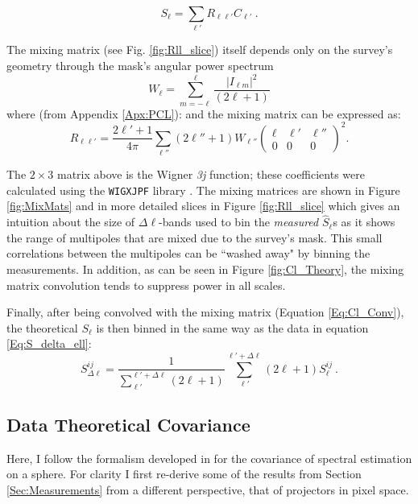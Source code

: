 \begin{equation}
S_{\ell} = \sum_{\ell'}R_{\ell \ell'} C_{\ell'} \ .
\label{Eq:Cl_Conv}
\end{equation}

\qquad The mixing matrix (see Fig. \ref{fig:Rll_slice}) itself depends only on the survey's geometry through the mask's angular power spectrum
\begin{equation}
W_{\ell} = \sum_{m=-\ell}^{\ell} \frac{|I_{\ell m}|^2}{(2\ell +1)}
\end{equation}
where (from Appendix \ref{Apx:PCL}):
and the mixing matrix can be expressed as:
\begin{equation}
R_{\ell \ell'} = \dfrac{2\ell' + 1}{4\pi}\sum_{\ell ''}(2\ell'' + 1)W_{\ell ''}\begin{pmatrix} \ell & \ell' & \ell'' \\ 0 & 0 & 0 \end{pmatrix}^2.
\label{Eq:MixMat}
\end{equation}

\noindent The $2 \times 3$ matrix above is the Wigner \textit{3j} function; these coefficients were calculated using the \texttt{WIGXJPF} library \citep{Wig3j}. The mixing matrices are shown in Figure \ref{fig:MixMats} and in more detailed slices in Figure \ref{fig:Rll_slice} which gives an intuition about the size of $\Delta\ell$-bands used to bin the \textit{measured} $\hat{S}_{\ell}$s as it shows the range of multipoles that are mixed due to the survey's mask. This small correlations between the multipoles can be ``washed away" by binning the measurements. In addition, as can be seen in Figure \ref{fig:Cl_Theory}, the mixing matrix convolution tends to suppress power in all scales.

\qquad Finally, after being convolved with the mixing matrix (Equation \eqref{Eq:Cl_Conv}), the theoretical $S_{\ell}$ is then binned in the same way as the data in equation \eqref{Eq:S_delta_ell}:
\begin{equation}S_{\Delta\ell}^{ij} = \frac{1}{\sum_{\ell'}^{\ell'+\Delta\ell}(2\ell+1)}\sum_{\ell'}^{\ell'+\Delta\ell}(2\ell+1)S_{\ell}^{ij}  \ .
\label{Eq:S_delta_ell2}
\end{equation}

\subsection{Data Theoretical Covariance}\label{Sec:TheoCov}
Here, I follow the formalism developed in \cite{2008DahlenSimons} for the covariance of spectral estimation on a sphere. For clarity I first re-derive some of the results from Section \ref{Sec:Measurements} from a different perspective, that of projectors in pixel space. 

